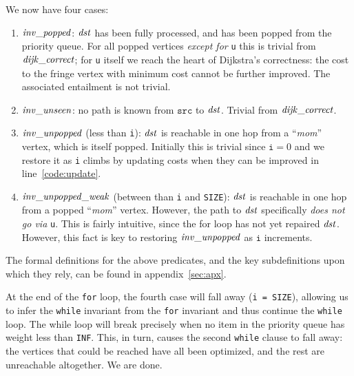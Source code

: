 We now have four cases:
\begin{enumerate}
\item $\mathit{inv\_popped}$: $\mathit{dst}$ has been fully processed, and has been
popped from the priority queue.  For all popped vertices \emph{except for} \texttt{u}
this is trivial from $\mathit{dijk\_correct}$; for \texttt{u} itself we reach the heart of Dijkstra's correctness: the cost to the fringe vertex with minimum cost cannot be further improved.  The associated entailment is not trivial.
\item $\mathit{inv\_unseen}$: no path is known from $\texttt{src}$ to $\mathit{dst}$.  Trivial from $\mathit{dijk\_correct}$.
\item $\mathit{inv\_unpopped}$ (less than \texttt{i}): $\mathit{dst}$ is reachable in
one hop from a ``\emph{mom}'' vertex, which is itself popped.  Initially this is trivial since $\texttt{i}=0$ and we restore it as \texttt{i} climbs by updating costs when they can be improved in line~\ref{code:update}.
\item $\mathit{inv\_unpopped\_weak}$ (between than \texttt{i} and \texttt{SIZE}):
$\mathit{dst}$ is reachable in one hop from a popped ``\emph{mom}'' vertex.
However, the path to $\mathit{dst}$ specifically \emph{does not go via} \texttt{u}.
This is fairly intuitive, since the for loop has not yet repaired $\mathit{dst}$.
However, this fact is key to restoring $\mathit{inv\_unpopped}$ as $\texttt{i}$
increments.
\end{enumerate}
The formal definitions for the above predicates, and the key subdefinitions upon which they rely, can be found in appendix~\ref{sec:apx}.

At the end of the \texttt{for} loop, the fourth case will fall away (\texttt{i = SIZE}),
allowing us to infer the \texttt{while} invariant from the \texttt{for} invariant and
thus continue the \texttt{while} loop.
The while loop will break precisely when no item in the priority queue has weight
less than \texttt{INF}. This, in turn, causes the second \texttt{while} clause to
fall away: the vertices that could be reached have all been optimized,
and the rest are unreachable altogether. We are done.

